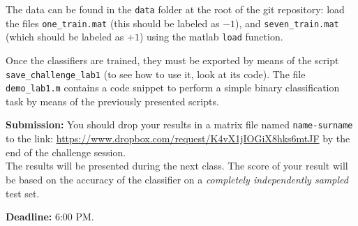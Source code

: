 \documentclass[DIN, pagenumber=false, fontsize=11pt, parskip=half]{scrartcl}
\begin{document}
The data can be found in the \texttt{data} folder at the root of the git repository: load the files \texttt{one\_train.mat} (this should be labeled as $-1$), and \texttt{seven\_train.mat} (which should be labeled as $+1$) using the matlab \texttt{load} function.

Once the classifiers are trained, they must be exported by means of the script \texttt{save\_challenge\_lab1}   (to see how to use it, look at its code). The file \texttt{demo\_lab1.m} contains a code snippet to perform a simple binary classification task by means of the previously presented scripts.



\begin{framed}
\textbf{Submission:}
You should drop your results in a matrix file named \texttt{name-surname} to the link: \url{https://www.dropbox.com/request/K4vX1jIOGiX8hks6mtJF} by the end of the challenge session.\\
The results will be presented during the next class. The score of your result will be based on the accuracy of the classifier on a \textit{completely independently sampled} test set.

\textbf{Deadline:} 6:00 PM.
\end{framed}
\end{document}
